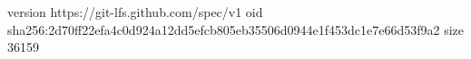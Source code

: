 version https://git-lfs.github.com/spec/v1
oid sha256:2d70ff22efa4c0d924a12dd5efcb805eb35506d0944e1f453dc1e7e66d53f9a2
size 36159
